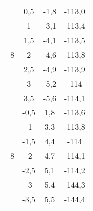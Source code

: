 \documentclass[11pt]{article}
\begin{document}
\begin{multicols}{2}
\begin{tabular}{|c|c|c|c|}
\multirow{7}{*}{-8} & 0,5 & -1,8 & -113,0 \\
& 1   & -3,1 & -113,4 \\
& 1,5 & -4,1 & -113,5 \\
& 2   & -4,6 & -113,8 \\
& 2,5 & -4,9 & -113,9 \\
& 3   & -5,2 & -114 \\
& 3,5 & -5,6 & -114,1 \\
\hline
\multirow{7}{*}{-8} & -0,5 & 1,8 & -113,6 \\
& -1   & 3,3 & -113,8 \\
& -1,5 & 4,4 & -114 \\
& -2   & 4,7 & -114,1 \\
& -2,5 & 5,1 & -114,2 \\
& -3   & 5,4 & -144,3 \\
& -3,5 & 5,5 & -144,4 \\
\hline
 
\end{tabular}

\end{multicols}
\end{document}
